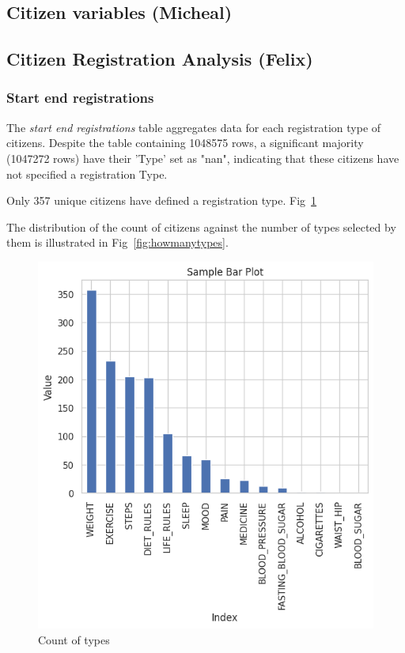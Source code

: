 \documentclass[12pt]{article}
\begin{document}
\subsection{Citizen variables (Micheal)}


\subsection{Citizen Registration Analysis (Felix)}

\subsubsection{Start end registrations}
The \textit{start end registrations} table aggregates data for each registration type of citizens. 
Despite the table containing 1048575 rows, a significant majority (1047272 rows) have their 'Type' set as "nan", indicating that these citizens have not specified a registration Type.

Only 357 unique citizens have defined a registration type. 
Fig~\ref{fig:countoftypes}

The distribution of the count of citizens against the number of types selected by them is illustrated in Fig~\ref{fig:howmanytypes}.

\begin{figure}[h]
\centering
\includegraphics[width=0.7\linewidth]{images/reg_types.png}
\caption{Count of types}
\label{fig:countoftypes}
\end{figure}
\end{document}
